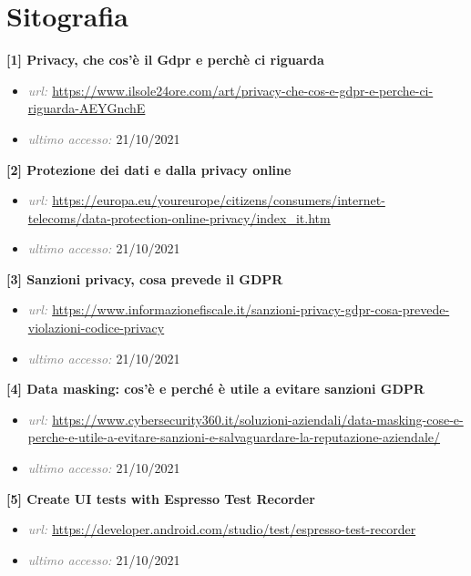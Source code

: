 \chapter*{Sitografia}
\rhead{}

\bigskip
\textbf{[1] Privacy, che cos’è il Gdpr e perchè ci riguarda}
\begin{itemize}[nosep]
\item[] \emph{\textcolor{gray}{url: }} \url{https://www.ilsole24ore.com/art/privacy-che-cos-e-gdpr-e-perche-ci-riguarda-AEYGnchE}
\item[] \emph{\textcolor{gray}{ultimo accesso: }} 21/10/2021
\end{itemize}
\bigskip
\textbf{[2] Protezione dei dati e dalla privacy online}
\begin{itemize}[nosep]
\item[] \emph{\textcolor{gray}{url: }} \url{https://europa.eu/youreurope/citizens/consumers/internet-telecoms/data-protection-online-privacy/index_it.htm}
\item[] \emph{\textcolor{gray}{ultimo accesso: }} 21/10/2021
\end{itemize}
\bigskip
\textbf{[3] Sanzioni privacy, cosa prevede il GDPR}
\begin{itemize}[nosep]
\item[] \emph{\textcolor{gray}{url: }} \url{https://www.informazionefiscale.it/sanzioni-privacy-gdpr-cosa-prevede-violazioni-codice-privacy}
\item[] \emph{\textcolor{gray}{ultimo accesso: }} 21/10/2021
\end{itemize}
\bigskip
\textbf{[4] Data masking: cos’è e perché è utile a evitare sanzioni GDPR}
\begin{itemize}[nosep]
\item[] \emph{\textcolor{gray}{url: }} \url{https://www.cybersecurity360.it/soluzioni-aziendali/data-masking-cose-e-perche-e-utile-a-evitare-sanzioni-e-salvaguardare-la-reputazione-aziendale/}
\item[] \emph{\textcolor{gray}{ultimo accesso: }} 21/10/2021
\end{itemize}
\bigskip
\textbf{[5] Create UI tests with Espresso Test Recorder}
\begin{itemize}[nosep]
\item[] \emph{\textcolor{gray}{url: }} \url{https://developer.android.com/studio/test/espresso-test-recorder}
\item[] \emph{\textcolor{gray}{ultimo accesso: }} 21/10/2021
\end{itemize}
